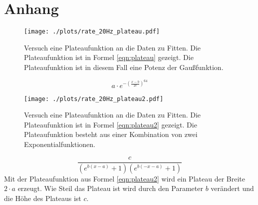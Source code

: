 \newpage
\section{Anhang}
\label{sec:Anhang}
\begin{figure}[H]
    \centering
    \texttt{[image: ./plots/rate\_20Hz\_plateau.pdf]}
    \caption{Versuch eine Plateaufunktion an die Daten zu Fitten. Die Plateaufunktion ist in Formel \ref{eqn:plateau} gezeigt. Die Plateaufunktion ist in diesem Fall eine Potenz der Gaußfunktion.}
    \label{fig:plateau}
\end{figure}
\begin{equation}
    a \cdot e^{-\left(\frac{x-b}{2c}\right)^{64}}
    \label{eqn:plateau}
\end{equation}

\begin{figure}[H]
    \centering
    \texttt{[image: ./plots/rate\_20Hz\_plateau2.pdf]}
    \caption{Versuch eine Plateaufunktion an die Daten zu Fitten. Die Plateaufunktion ist in Formel \ref{eqn:plateau2} gezeigt. Die Plateaufunktion besteht aus einer Kombination von zwei Exponentialfunktionen.}
    \label{fig:plateau2}
\end{figure}
\begin{equation}
    \frac{c}{ \left(e^{b\left(x-a\right)} +1\right) \left(e^{b\left(-x-a\right)} +1\right) }
    \label{eqn:plateau2}
\end{equation}
Mit der Plateaufunktion aus Formel \ref{eqn:plateau2} wird ein Plateau der Breite $2\cdot a$ erzeugt.
Wie Steil das Plateau ist wird durch den Parameter $b$ verändert und die Höhe des Plateaus ist $c$.